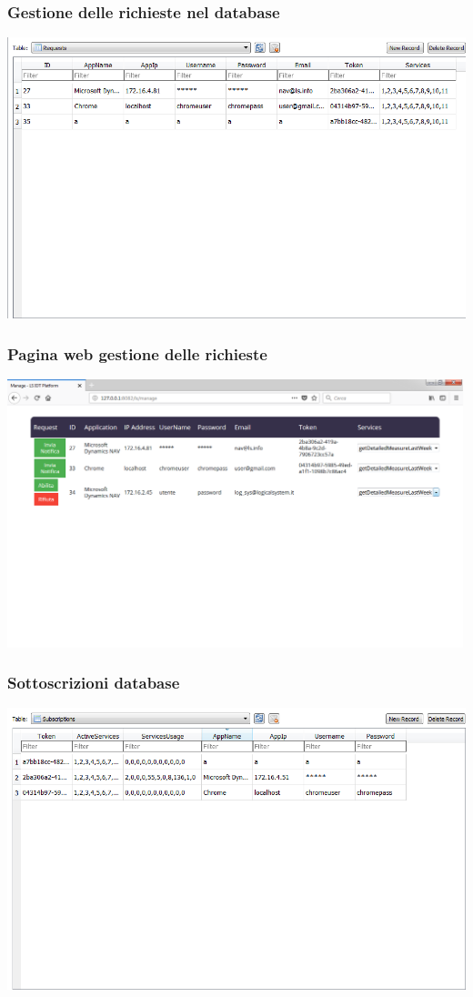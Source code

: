 \documentclass{beamer}
\begin{document}
\begin{frame}
\frametitle{Gestione delle richieste nel database}
\includegraphics[width=1\textwidth]{images/DBPlatform2.png}
\end{frame}

\begin{frame}
\frametitle{Pagina web gestione delle richieste}
\includegraphics[width=1\textwidth]{images/managePagePlatform.png}
\end{frame}

\begin{frame}
\frametitle{Sottoscrizioni database}
\includegraphics[width=1\textwidth]{images/DBPlatform3.png}
\end{frame}
\end{document}
